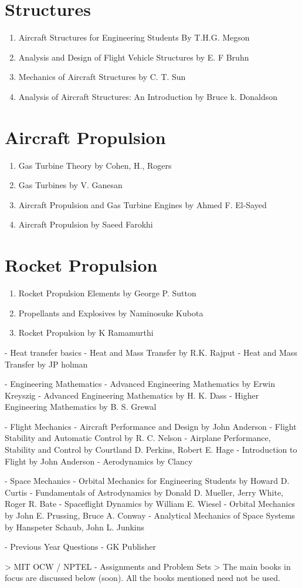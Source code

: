 \section{Structures}
\begin{enumerate}
  \item Aircraft Structures for Engineering Students By T.H.G. Megson
  \item Analysis and Design of Flight Vehicle Structures by E. F Bruhn
  \item Mechanics of Aircraft Structures by C. T. Sun
  \item Analysis of Aircraft Structures: An Introduction by Bruce k. Donaldson
\end{enumerate}

\section{Aircraft Propulsion}
\begin{enumerate}
  \item Gas Turbine Theory by Cohen, H., Rogers
  \item Gas Turbines by V. Ganesan
  \item Aircraft Propulsion and Gas Turbine Engines by Ahmed F. El-Sayed
  \item Aircraft Propulsion by Saeed Farokhi
\end{enumerate}

\section{Rocket Propulsion}
\begin{enumerate}
  \item Rocket Propulsion Elements by George P. Sutton
  \item Propellants and Explosives by Naminosuke Kubota
  \item Rocket Propulsion by K Ramamurthi
\end{enumerate}

- Heat transfer basics
- Heat and Mass Transfer by R.K. Rajput
- Heat and Mass Transfer by JP holman

- Engineering Mathematics
- Advanced Engineering Mathematics by Erwin Kreyszig
- Advanced Engineering Mathematics by H. K. Dass
- Higher Engineering Mathematics by B. S. Grewal

- Flight Mechanics
- Aircraft Performance and Design by John Anderson
- Flight Stability and Automatic Control by R. C. Nelson
- Airplane Performance, Stability and Control by Courtland D. Perkins, Robert E. Hage
- Introduction to Flight by John Anderson
- Aerodynamics by Clancy

- Space Mechanics
- Orbital Mechanics for Engineering Students by Howard D. Curtis
- Fundamentals of Astrodynamics by Donald D. Mueller, Jerry White, Roger R. Bate
- Spaceflight Dynamics by William E. Wiesel
- Orbital Mechanics by John E. Prussing, Bruce A. Conway
- Analytical Mechanics of Space Systems by Hanspeter Schaub, John L. Junkins

- Previous Year Questions
- GK Publisher

> MIT OCW / NPTEL - Assignments and Problem Sets
> The main books in focus are discussed below (soon). All the books mentioned need not be used.

